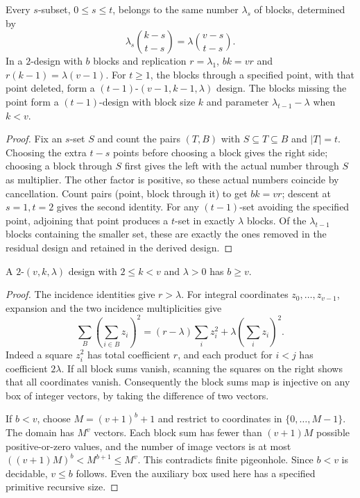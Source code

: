 \begin{theorem}\label{result42}
Every \(s\)-subset, \(0\le s\le t\), belongs to the same number
\(\lambda_s\) of blocks, determined by
\[
 \lambda_s\binom{k-s}{t-s}=\lambda\binom{v-s}{t-s}.
\]
In a \(2\)-design with \(b\) blocks and replication \(r=\lambda_1\),
\(bk=vr\) and \(r(k-1)=\lambda(v-1)\).
For \(t\ge 1\), the blocks through a specified point, with that point
deleted, form a \((t-1)\)-\((v-1,k-1,\lambda)\) design.
The blocks missing the point form a \((t-1)\)-design with block size
\(k\) and parameter \(\lambda_{t-1}-\lambda\) when \(k<v\).
\end{theorem}
\begin{proof}
Fix an \(s\)-set \(S\) and count the pairs \((T,B)\) with
\(S\subseteq T\subseteq B\) and \(|T|=t\). Choosing the extra
\(t-s\) points before choosing a block gives the right side; choosing
a block through \(S\) first gives the left with the actual number
through \(S\) as multiplier. The other factor is positive, so these
actual numbers coincide by cancellation. Count pairs (point, block
through it) to get \(bk=vr\); descent at \(s=1,t=2\) gives the second
identity. For any \((t-1)\)-set avoiding the specified point, adjoining
that point produces a \(t\)-set in exactly \(\lambda\) blocks. Of the
\(\lambda_{t-1}\) blocks containing the smaller set, these are exactly
the ones removed in the residual design and retained in the derived design.
\end{proof}

\begin{theorem}\label{result43}
A \(2\)-\((v,k,\lambda)\) design with \(2\le k<v\) and \(\lambda>0\)
has \(b\ge v\).
\end{theorem}
\begin{proof}
The incidence identities give \(r>\lambda\). For integral coordinates
\(z_0,\ldots,z_{v-1}\), expansion and the two incidence multiplicities give
\[
 \sum_B\left(\sum_{i\in B}z_i\right)^2
  =(r-\lambda)\sum_i z_i^2+\lambda\left(\sum_i z_i\right)^2.
\]
Indeed a square \(z_i^2\) has total coefficient \(r\), and each product for
\(i<j\) has coefficient \(2\lambda\). If all block sums vanish, scanning
the squares on the right shows that all coordinates vanish. Consequently
the block sums map is injective on any box of integer vectors, by taking
the difference of two vectors.

If \(b<v\), choose \(M=(v+1)^b+1\) and restrict to coordinates in
\(\{0,\ldots,M-1\}\). The domain has \(M^v\) vectors. Each block sum
has fewer than \((v+1)M\) possible positive-or-zero values, and the
number of image vectors is at most
\(((v+1)M)^b<M^{b+1}\le M^v\).
This contradicts finite pigeonhole. Since \(b<v\) is decidable, \(v\le b\)
follows. Even the auxiliary box used here has a specified primitive
recursive size.
\end{proof}

